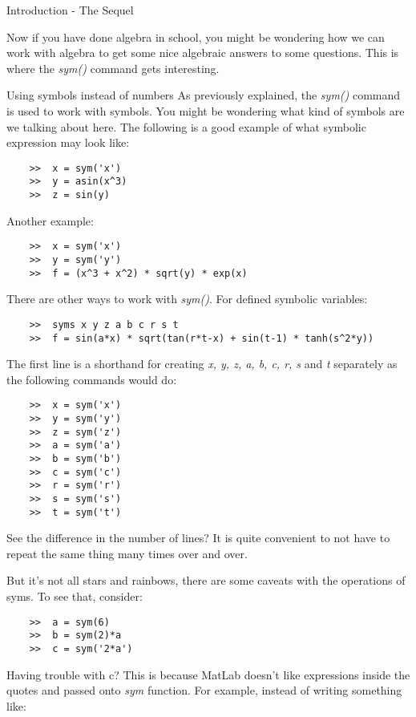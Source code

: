\documentclass[11pt, oneside]{report}   	%
\begin{document}
\begin{chapter}{Introduction - The Sequel}

Now if you have done algebra in school, you might be wondering how we can work with algebra to get some nice
algebraic answers to some questions. This is where the \textit{sym()} command gets interesting.

\begin{section}{Using symbols instead of numbers}
As previously explained, the \textit{sym()} command is used to work with symbols. You might be wondering what
kind of symbols are we talking about here. The following is a good example of what symbolic expression may look
like:

\begin{lstlisting}
	>>	x = sym('x')
	>>	y = asin(x^3)
	>>	z = sin(y)
\end{lstlisting}

Another example:
\begin{lstlisting}
	>>	x = sym('x')
	>>	y = sym('y')
	>>	f = (x^3 + x^2) * sqrt(y) * exp(x)
\end{lstlisting}

There are other ways to work with \textit{sym()}. For defined symbolic variables:

\begin{lstlisting}
	>>	syms x y z a b c r s t
	>>	f = sin(a*x) * sqrt(tan(r*t-x) + sin(t-1) * tanh(s^2*y))
\end{lstlisting}

The first line is a shorthand for creating \textit{x, y, z, a, b, c, r, s} and \textit{t} separately as the following 
commands would do:

\begin{lstlisting}
	>>	x = sym('x')
	>>	y = sym('y')
	>>	z = sym('z')
	>>	a = sym('a')
	>>	b = sym('b')
	>>	c = sym('c')
	>>	r = sym('r')
	>>	s = sym('s')
	>>	t = sym('t')
\end{lstlisting}

See the difference in the number of lines? It is quite convenient to not have to repeat the same thing many times
over and over.

But it's not all stars and rainbows, there are some caveats with the operations of syms. To see that, consider:

\begin{lstlisting}
	>>	a = sym(6)
	>>	b = sym(2)*a
	>>	c = sym('2*a')
\end{lstlisting}

Having trouble with c? This is because MatLab doesn't like expressions inside the quotes and passed onto
\textit{sym} function. For example, instead of writing something like:


\end{section}
\end{chapter}
\end{document}
